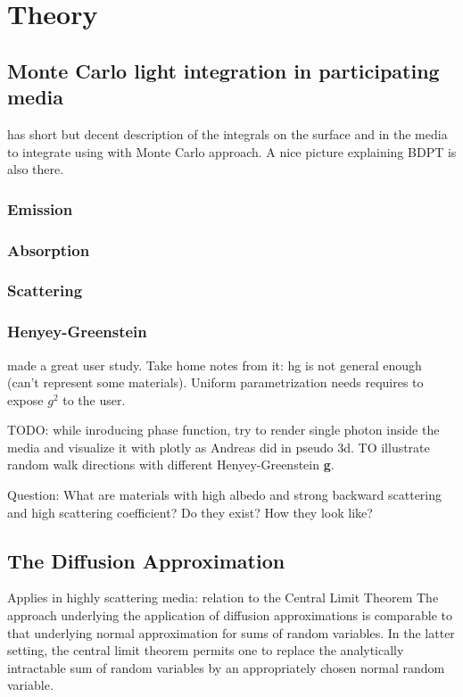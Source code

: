 \chapter{Theory}
\label{chapter:theory}


\section{Monte Carlo light integration in participating media}
\cite{Lafortune:1996:RPM:275458.275468} has short but decent description of the
integrals on the surface and in the media to integrate using with Monte Carlo
approach.
A nice picture explaining BDPT is also there.

\subsection{Emission}
\subsection{Absorption}
\subsection{Scattering}

\subsection{Henyey-Greenstein}
\cite{Gkioulekas:2013:IVR:2508363.2508377} made a great user study.
Take home notes from it: \gls{hg} is not general enough (can't represent some
materials). Uniform parametrization needs requires to expose $g^2$ to the user.

TODO: while inroducing phase function, try to render single photon inside the
media and visualize it with plotly as Andreas did in pseudo 3d. TO illustrate
random walk directions with different Henyey-Greenstein \textbf{g}.

Question: What are materials with high albedo and strong backward scattering
and high scattering coefficient? Do they exist? How they look like?

\section{The Diffusion Approximation}
Applies in highly scattering media: relation to the Central Limit Theorem
The approach underlying the application of diffusion approximations is comparable to that underlying normal approximation for
sums of random variables. In the latter setting, the central limit theorem
permits one to replace the analytically intractable sum of random variables by
an appropriately chosen normal random variable.

